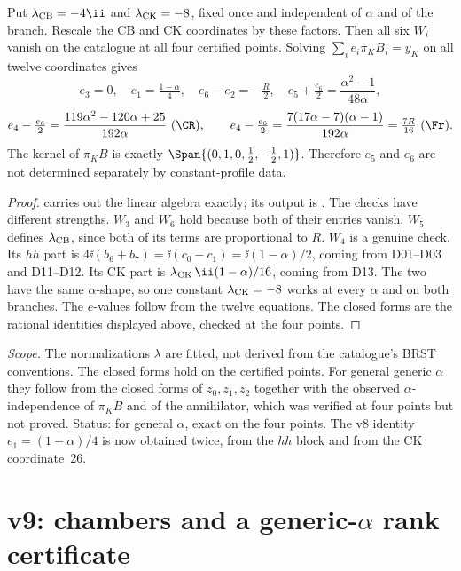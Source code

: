 \begin{theorem}
\label{thm:v9ghost}
Put \(\lambda_{\rm CB}=-4\ii\) and \(\lambda_{\rm CK}=-8\), fixed
once and independent of \(\alpha\) and of the branch. Rescale the
CB and CK coordinates by these factors. Then all six \(W_i\)
vanish on the catalogue at all four certified points. Solving
\(\sum_ie_i\pi_KB_i=y_K\) on all twelve coordinates gives
\[
 e_3=0,\quad e_1=\tfrac{1-\alpha}4,\quad
 e_6-e_2=-\tfrac R2,\quad
 e_5+\tfrac{e_6}2=\frac{\alpha^2-1}{48\alpha},
\]
\[
 e_4-\tfrac{e_6}2=\frac{119\alpha^2-120\alpha+25}{192\alpha}\ (\CR),\qquad
 e_4-\tfrac{e_6}2=\frac{7(17\alpha-7)(\alpha-1)}{192\alpha}=\tfrac{7R}{16}\ (\Fr).
\]
The kernel of \(\pi_KB\) is exactly
\(\Span\{(0,1,0,\tfrac12,-\tfrac12,1)\}\). Therefore \(e_5\) and
\(e_6\) are not determined separately by constant-profile data.
\end{theorem}

\begin{proof}
 carries out the linear algebra exactly; its output is
. The checks have different strengths.
\(W_3\) and \(W_6\) hold because both of their entries vanish.
\(W_5\) defines \(\lambda_{\rm CB}\), since both of its terms are
proportional to \(R\).
\(W_4\) is a genuine check. Its \(hh\) part is
\(4\ii(b_6+b_7)=\ii(c_0-c_1)=\ii(1-\alpha)/2\), coming from
D01--D03 and D11--D12. Its CK part is
\(\lambda_{\rm CK}\,\ii(1-\alpha)/16\), coming from D13. The two
have the same \(\alpha\)-shape, so one constant
\(\lambda_{\rm CK}=-8\) works at every \(\alpha\) and on both
branches. The \(e\)-values follow from the twelve equations. The
closed forms are the rational identities displayed above,
checked at the four points.
\end{proof}

\noindent\emph{Scope.} The normalizations \(\lambda\) are fitted,
not derived from the catalogue's BRST conventions. The closed
forms hold on the certified points. For general generic \(\alpha\)
they follow from the closed forms of \(z_0,z_1,z_2\) together with
the observed \(\alpha\)-independence of \(\pi_KB\) and of the
annihilator, which was verified at four points but not proved.
Status: \PARTIAL{} for general \(\alpha\), exact on the four points.
The v8 identity \(e_1=(1-\alpha)/4\) is now obtained twice, from
the \(hh\) block and from the CK coordinate~26.

\section{v9: chambers and a generic-\texorpdfstring{\(\alpha\)}{alpha} rank certificate}
\label{sec:v9chamber}

